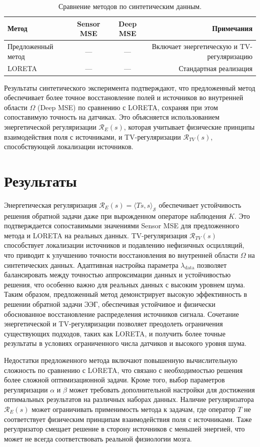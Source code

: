 \documentclass[sn-mathphys-num]{bst/sn-jnl}
\theoremstyle{thmstylethree}
\theoremstyle{thmstyletwo}
\theoremstyle{thmstyleone}
\begin{document}
\begin{table}[h]
\centering
\begin{tabular}{lccr}
\hline
Метод & Sensor MSE & Deep MSE & Примечания \\
\hline
Предложенный метод & --- & --- & Включает энергетическую и TV-регуляризацию \\
LORETA & --- & --- & Стандартная реализация \\
\hline
\end{tabular}
\caption{Сравнение методов по синтетическим данным.}
\label{tab:synthetic_results}
\end{table}

Результаты синтетического эксперимента подтверждают, что предложенный метод обеспечивает более точное восстановление полей и источников во внутренней области $\Omega$ (Deep MSE) по сравнению с LORETA, сохраняя при этом сопоставимую точность на датчиках. Это объясняется использованием энергетической регуляризации $\mathcal{R}_E(s)$, которая учитывает физические принципы взаимодействия поля с источниками, и TV-регуляризации $\mathcal{R}_{TV}(s)$, способствующей локализации источников.

\section{Результаты}
\label{subsec:discussion}
Энергетическая регуляризация $\mathcal{R}_E(s) = \langle Ts, s \rangle_{\mathcal{S}}$ обеспечивает устойчивость решения обратной задачи даже при вырожденном операторе наблюдения $K$. Это подтверждается сопоставимыми значениями Sensor MSE для предложенного метода и LORETA на реальных данных.
TV-регуляризация $\mathcal{R}_{TV}(s)$ способствует локализации источников и подавлению нефизичных осцилляций, что приводит к улучшению точности восстановления во внутренней области $\Omega$ на синтетических данных.
Адаптивная настройка параметра $\lambda_{\mathrm{data}}$ позволяет балансировать между точностью аппроксимации данных и устойчивостью решения, что особенно важно для реальных данных с высоким уровнем шума.
Таким образом, предложенный метод демонстрирует высокую эффективность в решении обратной задачи ЭЭГ, обеспечивая устойчивое и физически обоснованное восстановление распределения источников сигнала.
 Сочетание энергетической и TV-регуляризации позволяет преодолеть ограничения существующих подходов, таких как LORETA, и получить более точные результаты в условиях ограниченного 
 числа датчиков и высокого уровня шума.

Недостатки предложенного метода включают повышенную вычислительную сложность по сравнению с LORETA, что связано с необходимостью решения более сложной оптимизационной задачи. 
Кроме того, выбор параметров регуляризации $\alpha$ и $\beta$ может требовать дополнительной настройки для достижения оптимальных результатов на различных наборах данных. Наличие регуляризатора 
$\mathcal{R}_E(s)$ может ограничивать применимость метода к задачам, где оператор $T$ не соответствует физическим принципам взаимодействия поля с источниками. Таже регулризатор смещает решение 
в сторону источников с меньшей энергией, что может не всегда соответствовать реальной физиологии мозга.


\end{document}
